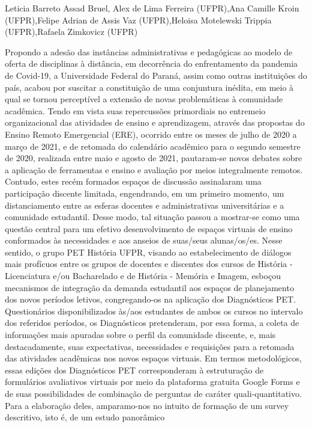 Leticia Barreto Assad Bruel, Alex de Lima Ferreira (UFPR),Ana Camille Kroin (UFPR),Felipe Adrian de Assis Vaz (UFPR),Heloisa Motelewski Trippia (UFPR),Rafaela Zimkovicz (UFPR)

Propondo a adesão das instâncias administrativas e pedagógicas ao modelo de oferta de
disciplinas à distância, em decorrência do enfrentamento da pandemia de Covid-19, a
Universidade Federal do Paraná, assim como outras instituições do país, acabou por suscitar a
constituição de uma conjuntura inédita, em meio à qual se tornou perceptível a extensão de
novas problemáticas à comunidade acadêmica. Tendo em vista suas repercussões primordiais no
entremeio organizacional das atividades de ensino e aprendizagem, através das propostas do
Ensino Remoto Emergencial (ERE), ocorrido entre os meses de julho de 2020 a março de 2021,
e de retomada do calendário acadêmico para o segundo semestre de 2020, realizada entre maio e
agosto de 2021, pautaram-se novos debates sobre a aplicação de ferramentas e ensino e avaliação
por meios integralmente remotos. Contudo, estes recém formados espaços de discussão
assinalaram uma participação discente limitada, engendrando, em um primeiro momento, um
distanciamento entre as esferas docentes e administrativas universitárias e a comunidade
estudantil. Desse modo, tal situação passou a mostrar-se como uma questão central para um
efetivo desenvolvimento de espaços virtuais de ensino conformados às necessidades e aos
anseios de suas/seus alunas/os/es. Nesse sentido, o grupo PET História UFPR, visando ao
estabelecimento de diálogos mais profícuos entre os grupos de docentes e discentes dos cursos
de História - Licenciatura e/ou Bacharelado e de História - Memória e Imagem, esboçou
mecanismos de integração da demanda estudantil aos espaços de planejamento dos novos
períodos letivos, congregando-os na aplicação dos Diagnósticos PET. Questionários
disponibilizados às/aos estudantes de ambos os cursos no intervalo dos referidos períodos, os
Diagnósticos pretenderam, por essa forma, a coleta de informações mais apuradas sobre o perfil
da comunidade discente, e, mais destacadamente, suas expectativas, necessidades e requisições
para a retomada das atividades acadêmicas nos novos espaços virtuais. Em termos
metodológicos, essas edições dos Diagnósticos PET corresponderam à estruturação de
formulários avaliativos virtuais por meio da plataforma gratuita Google Forms e de suas
possibilidades de combinação de perguntas de caráter quali-quantitativo. Para a elaboração deles,
amparamo-nos no intuito de formação de um survey descritivo, isto é, de um estudo panorâmico
